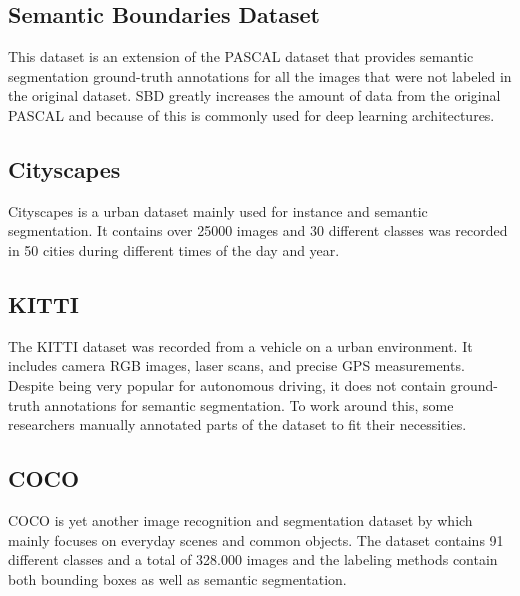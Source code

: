 \subsection{Semantic Boundaries Dataset}
This dataset is an extension of the PASCAL dataset that provides semantic segmentation ground-truth annotations for all the images that were not labeled in the original dataset. SBD greatly increases the amount of data from the original PASCAL and because of this is commonly used for deep learning architectures.

\subsection{Cityscapes}
Cityscapes is a urban dataset mainly used for instance and semantic segmentation. It contains over 25000 images and 30 different classes was recorded in 50 cities during different times of the day and year.

\subsection{KITTI}
The KITTI dataset \cite{Geiger2013IJRR} was recorded from a vehicle on a urban environment. It includes camera RGB images, laser scans, and precise GPS measurements. Despite being very popular for autonomous driving, it does not contain ground-truth annotations for semantic segmentation. To work around this, some researchers manually annotated parts of the dataset to fit their necessities. 

\subsection{COCO}
COCO is yet another image recognition and segmentation dataset by \cite{DBLP:journals/corr/LinMBHPRDZ14} which mainly focuses on everyday scenes and common objects. The dataset contains 91 different classes and a total of 328.000 images and the labeling methods contain both bounding boxes as well as semantic segmentation.